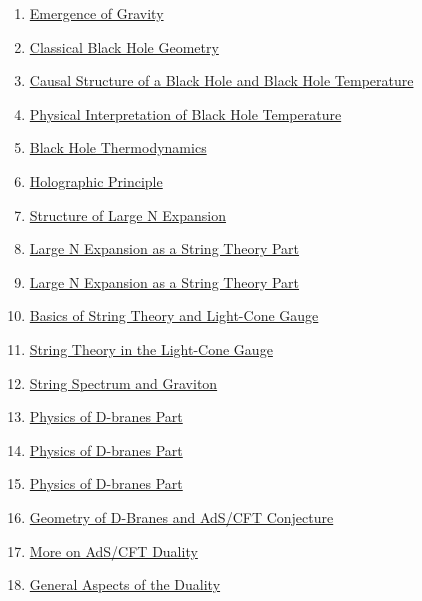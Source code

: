 \documentclass[11pt]{article}
\begin{document}
\begin{enumerate}
	\item  \href{https://mp.weixin.qq.com/s/eOrWQLzrF_XtzCvwFzEv3Q}{Emergence of Gravity} %
	\item  \href{https://mp.weixin.qq.com/s/UoHH6vHbT7h61Q1bv9iilw}{Classical Black Hole Geometry} %
	\item  \href{https://mp.weixin.qq.com/s/hoG97CP7LhuI1xuEwrf5Cg}{Causal Structure of a Black Hole and Black Hole Temperature} %
	\item  \href{https://mp.weixin.qq.com/s/IldO9LYi8p043ra7-n6cPg}{Physical Interpretation of Black Hole Temperature} %
	\item  \href{https://mp.weixin.qq.com/s/A1L_ybE_YM26nTO4JpCkLg}{Black Hole Thermodynamics} %
	\item  \href{https://mp.weixin.qq.com/s/M0q_VyybyA3ieNwlmpQexw}{Holographic Principle} %
	\item  \href{https://mp.weixin.qq.com/s/cjuKYASfG4gR7Bo_ZNm_wA}{Structure of Large N Expansion} %
	\item  \href{https://mp.weixin.qq.com/s/WYbPBbONAMLIihXyQmrtDA}{Large N Expansion as a String Theory Part } %
	\item  \href{https://mp.weixin.qq.com/s/fzVvwODFqsnLK2DZRPY79g}{Large N Expansion as a String Theory Part } %
	\item  \href{https://mp.weixin.qq.com/s/iD1mnd-8_W0t7MSLBhsvCA}{Basics of String Theory and Light-Cone Gauge} %
	\item  \href{https://mp.weixin.qq.com/s/ZYYVJtt_RL_MvRBlJUiLKA}{String Theory in the Light-Cone Gauge} %
	\item  \href{https://mp.weixin.qq.com/s/fcCLG5Ipj6smiyuGQTJhgA}{String Spectrum and Graviton} %
	\item  \href{https://mp.weixin.qq.com/s/DTDkJU8yc2HTvCKBy6_ZHg}{Physics of D-branes Part } %
	\item  \href{https://mp.weixin.qq.com/s/FEF20Hrl1f7Spg8EL23qtQ}{Physics of D-branes Part } %
	\item  \href{https://mp.weixin.qq.com/s/80NGtWU0f2vTNJ-lVvAvcA}{Physics of D-branes Part } %
	\item  \href{https://mp.weixin.qq.com/s/QnBDPW5NLQiIMOL1NnGQDQ}{Geometry of D-Branes and AdS/CFT Conjecture} %
	\item  \href{https://mp.weixin.qq.com/s/I6wPbghTzONTTPcKoWz87A}{More on AdS/CFT Duality} %
	\item  \href{https://mp.weixin.qq.com/s/8EmUrJe5fiWaEEEIHZiUTg}{General Aspects of the Duality} %

\end{enumerate}
\end{document}
